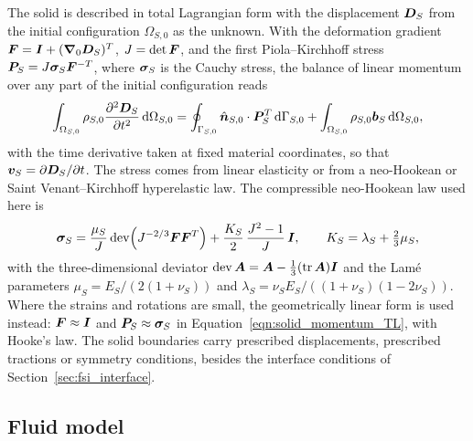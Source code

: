 The solid is described in total Lagrangian form with the displacement $\boldsymbol{D}_S$ from the initial configuration $\Omega_{S,0}$ as the unknown.
With the deformation gradient $\boldsymbol{F} = \boldsymbol{I} + (\boldsymbol{\nabla}_0 \boldsymbol{D}_S)^T$, $J = \det\boldsymbol{F}$, and the first Piola--Kirchhoff stress $\boldsymbol{P}_S = J\boldsymbol{\sigma}_S\boldsymbol{F}^{-T}$, where $\boldsymbol{\sigma}_S$ is the Cauchy stress, the balance of linear momentum over any part of the initial configuration reads
\begin{equation}
    \int_{\Omega_{S,0}} \rho_{S,0} \frac{\partial^2 \boldsymbol{D}_S}{\partial t^2} \, \text{d}\Omega_{S,0}
    =
    \oint_{\Gamma_{S,0}} \hat{\boldsymbol{n}}_{S,0} \cdot \boldsymbol{P}_S^T \, \text{d}\Gamma_{S,0}
    +
    \int_{\Omega_{S,0}} \rho_{S,0} \boldsymbol{b}_S \, \text{d}\Omega_{S,0},
    \label{eqn:solid_momentum_TL}
\end{equation}
with the time derivative taken at fixed material coordinates, so that $\boldsymbol{v}_S = \partial\boldsymbol{D}_S/\partial t$.
The stress comes from linear elasticity or from a neo-Hookean or Saint Venant--Kirchhoff hyperelastic law.
The compressible neo-Hookean law used here is
\begin{equation}
    \boldsymbol{\sigma}_S = \frac{\mu_S}{J}\,\mathrm{dev}\!\left(J^{-2/3}\boldsymbol{F}\boldsymbol{F}^T\right) + \frac{K_S}{2}\,\frac{J^2 - 1}{J}\,\boldsymbol{I},
    \qquad K_S = \lambda_S + \tfrac{2}{3}\mu_S ,
    \label{eqn:neo_hookean}
\end{equation}
with the three-dimensional deviator $\mathrm{dev}\,\boldsymbol{A} = \boldsymbol{A} - \tfrac13(\mathrm{tr}\,\boldsymbol{A})\boldsymbol{I}$ and the Lam\'e parameters $\mu_S = E_S/(2(1+\nu_S))$ and $\lambda_S = \nu_S E_S/((1+\nu_S)(1-2\nu_S))$.
Where the strains and rotations are small, the geometrically linear form is used instead: $\boldsymbol{F} \approx \boldsymbol{I}$ and $\boldsymbol{P}_S \approx \boldsymbol{\sigma}_S$ in Equation~\eqref{eqn:solid_momentum_TL}, with Hooke's law.
The solid boundaries carry prescribed displacements, prescribed tractions or symmetry conditions, besides the interface conditions of Section~\ref{sec:fsi_interface}.

\subsection{Fluid model}
\label{sec:fluid_governing_eqn}

